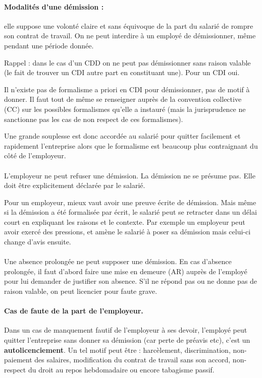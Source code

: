 \paragraph{Modalités d'une démission :} elle suppose une volonté claire et sans équivoque de la part du salarié de rompre son contrat de travail.
On ne peut interdire à un employé de démissionner, même pendant une période donnée.

Rappel : dans le cas d'un CDD on ne peut pas démissionner sans raison valable (le fait de trouver un CDI autre part en constituant une).
Pour un CDI oui.

Il n’existe pas de formalisme a priori en CDI pour démissionner, pas de motif à donner.
Il faut tout de même se renseigner auprès de la convention collective (CC) sur les possibles formalismes qu’elle a instauré (mais la jurisprudence ne sanctionne pas les cas de non respect de ces formalismes).

Une grande souplesse est donc accordée au salarié pour quitter facilement et rapidement l'entreprise alors que le formalisme est beaucoup plus contraignant du côté de l'employeur.

\paragraph{}
L’employeur ne peut refuser une démission.
La démission ne se présume pas.
Elle doit être explicitement déclarée par le salarié.

Pour un employeur, mieux vaut avoir une preuve écrite de démission.
Mais même si la démission a été formalisée par écrit, le salarié peut se retracter dans un délai court en expliquant les raisons et le contexte.
Par exemple un employeur peut avoir exercé des pressions, et amène le salarié à poser sa démission mais celui-ci change d'avis ensuite.

\paragraph{}
Une absence prolongée ne peut supposer une démission.
En cas d’absence prolongée, il faut d’abord faire une mise en demeure (AR) auprès de l’employé pour lui demander de justifier son absence.
S’il ne répond pas ou ne donne pas de raison valable, on peut licencier pour faute grave.

\paragraph{Cas de faute de la part de l'employeur.}
Dans un cas de manquement fautif de l'employeur à ses devoir, l'employé peut quitter l’entreprise sans donner sa démission (car perte de préavis etc), c'est un \textbf{autolicenciement}.
Un tel motif peut être : harcèlement, discrimination, non-paiement des salaires, modification du contrat de travail sans son accord, non-respect du droit au repos hebdomadaire ou encore tabagisme passif.

